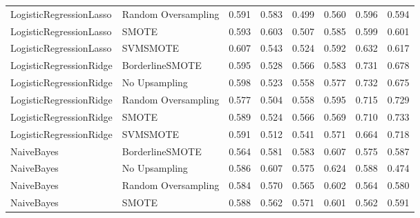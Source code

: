 \begin{tabular}{llllllll}
     LogisticRegressionLasso & Random Oversampling & 0.591 &                     0.583 &                 0.499 &                  0.560 &                                   0.596 &     0.594 \\
     LogisticRegressionLasso &               SMOTE & 0.593 &                     0.603 &                 0.507 &                  0.585 &                                   0.599 &     0.601 \\
     LogisticRegressionLasso &            SVMSMOTE & 0.607 &                     0.543 &                 0.524 &                  0.592 &                                   0.632 &     0.617 \\
     LogisticRegressionRidge &     BorderlineSMOTE & 0.595 &                     0.528 &                 0.566 &                  0.583 &                                   0.731 &     0.678 \\
     LogisticRegressionRidge &       No Upsampling & 0.598 &                     0.523 &                 0.558 &                  0.577 &                                   0.732 &     0.675 \\
     LogisticRegressionRidge & Random Oversampling & 0.577 &                     0.504 &                 0.558 &                  0.595 &                                   0.715 &     0.729 \\
     LogisticRegressionRidge &               SMOTE & 0.589 &                     0.524 &                 0.566 &                  0.569 &                                   0.710 &     0.733 \\
     LogisticRegressionRidge &            SVMSMOTE & 0.591 &                     0.512 &                 0.541 &                  0.571 &                                   0.664 &     0.718 \\
                  NaiveBayes &     BorderlineSMOTE & 0.564 &                     0.581 &                 0.583 &                  0.607 &                                   0.575 &     0.587 \\
                  NaiveBayes &       No Upsampling & 0.586 &                     0.607 &                 0.575 &                  0.624 &                                   0.588 &     0.474 \\
                  NaiveBayes & Random Oversampling & 0.584 &                     0.570 &                 0.565 &                  0.602 &                                   0.564 &     0.580 \\
                  NaiveBayes &               SMOTE & 0.588 &                     0.562 &                 0.571 &                  0.601 &                                   0.562 &     0.591 \\

\end{tabular}
